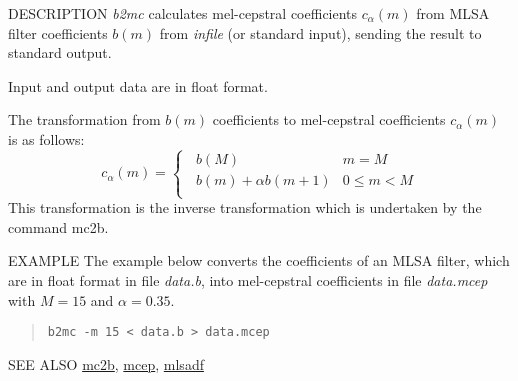 \begin{synopsis}
\item [b2mc] [ --m $M$ ] [ --a $A$ ] [ {\em infile} ]
\end{synopsis}

\begin{qsection}{DESCRIPTION}
{\em b2mc} calculates mel-cepstral coefficients $c_\alpha(m)$ 
from MLSA filter coefficients $b(m)$ from {\em infile} (or standard input), 
sending the result to standard output.

Input and output data are in float format.

The transformation from $b(m)$ coefficients to mel-cepstral coefficients
$c_\alpha(m)$ is as follows:
\begin{displaymath}
c_\alpha(m) = \begin{cases}
	  \;\; b(M) & m=M \\
	  \;\; b(m) + \alpha b(m+1) & 0 \leq m < M \\
	\end{cases}
\end{displaymath}
This transformation is the inverse transformation which is undertaken
by the command mc2b.

\end{qsection}

\begin{options}
\end{options}

\begin{qsection}{EXAMPLE}
The example below converts the coefficients of an MLSA filter,
which are in float format in file {\em data.b},
into mel-cepstral coefficients
in file {\em data.mcep} with $M=15$ and $\alpha=0.35$.
\begin{quote}
 \verb!b2mc -m 15 < data.b > data.mcep!
\end{quote} 
\end{qsection}

\begin{qsection}{SEE ALSO}
\hyperlink{mc2b}{mc2b},
\hyperlink{mcep}{mcep},
\hyperlink{mlsadf}{mlsadf}
\end{qsection}
